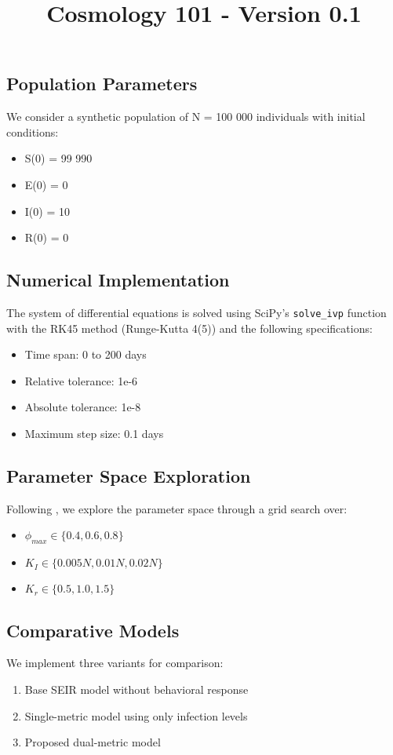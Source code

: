 \documentclass{article}\usepackage{graphicx} \usepackage{amsmath} \usepackage{colortbl}\title{Cosmology 101 - Version 0.1}
\begin{document}
\subsection{Population Parameters}
We consider a synthetic population of N = 100 000 individuals with initial conditions:
\begin{itemize}
\item S(0) = 99 990
\item E(0) = 0
\item I(0) = 10
\item R(0) = 0
\end{itemize}

\subsection{Numerical Implementation}
The system of differential equations is solved using SciPy's \texttt{solve\_ivp} function with the RK45 method (Runge-Kutta 4(5)) and the following specifications:
\begin{itemize}
\item Time span: 0 to 200 days
\item Relative tolerance: 1e-6
\item Absolute tolerance: 1e-8
\item Maximum step size: 0.1 days
\end{itemize}

\subsection{Parameter Space Exploration}
Following \cite{funk2010modelling}, we explore the parameter space through a grid search over:
\begin{itemize}
\item $\phi_{max} \in \{0.4, 0.6, 0.8\}$
\item $K_I \in \{0.005N, 0.01N, 0.02N\}$
\item $K_r \in \{0.5, 1.0, 1.5\}$
\end{itemize}

\subsection{Comparative Models}
We implement three variants for comparison:
\begin{enumerate}
\item Base SEIR model without behavioral response
\item Single-metric model using only infection levels
\item Proposed dual-metric model
\end{enumerate}
\end{document}
